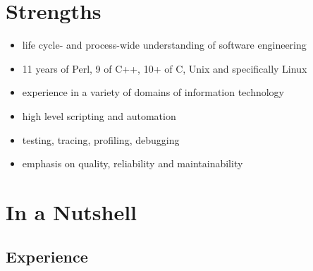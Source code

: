 \documentclass[a4paper,12pt]{article}
\newcommand{\compress}{\setlength\itemsep{-\parskip}}
\begin{document}
\section{Strengths}

\begin{itemize}\compress
\item	life cycle- and process-wide understanding of software engineering
\item	11 years of Perl, 9 of C++, 10+ of C, Unix and specifically Linux
\item	experience in a variety of domains of information technology
\item	high level scripting and automation
\item	testing, tracing, profiling, debugging
\item	emphasis on quality, reliability and maintainability
\end{itemize}

\section{In a Nutshell}

\subsection*{Experience}
\end{document}
